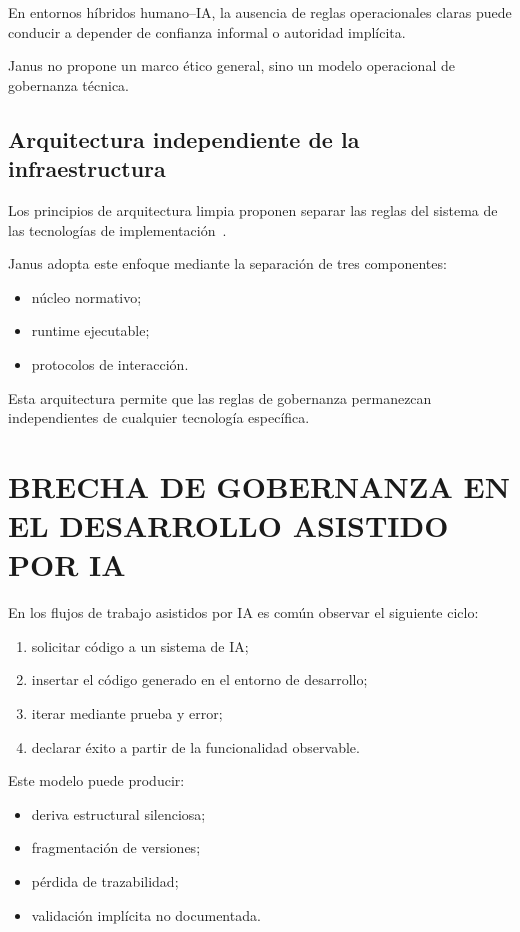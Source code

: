 \documentclass[conference]{IEEEtran}
\begin{document}
En entornos híbridos humano--IA, la ausencia de reglas operacionales claras puede conducir a depender de confianza informal o autoridad implícita.

Janus no propone un marco ético general, sino un modelo operacional de gobernanza técnica.

\subsection{Arquitectura independiente de la infraestructura}
Los principios de arquitectura limpia proponen separar las reglas del sistema de las tecnologías de implementación~\cite{martin2017}.

Janus adopta este enfoque mediante la separación de tres componentes:
\begin{itemize}
  \item núcleo normativo;
  \item runtime ejecutable;
  \item protocolos de interacción.
\end{itemize}
Esta arquitectura permite que las reglas de gobernanza permanezcan independientes de cualquier tecnología específica.

\section{BRECHA DE GOBERNANZA EN EL DESARROLLO ASISTIDO POR IA}
En los flujos de trabajo asistidos por IA es común observar el siguiente ciclo:
\begin{enumerate}
  \item solicitar código a un sistema de IA;
  \item insertar el código generado en el entorno de desarrollo;
  \item iterar mediante prueba y error;
  \item declarar éxito a partir de la funcionalidad observable.
\end{enumerate}
Este modelo puede producir:
\begin{itemize}
  \item deriva estructural silenciosa;
  \item fragmentación de versiones;
  \item pérdida de trazabilidad;
  \item validación implícita no documentada.
\end{itemize}
\end{document}
